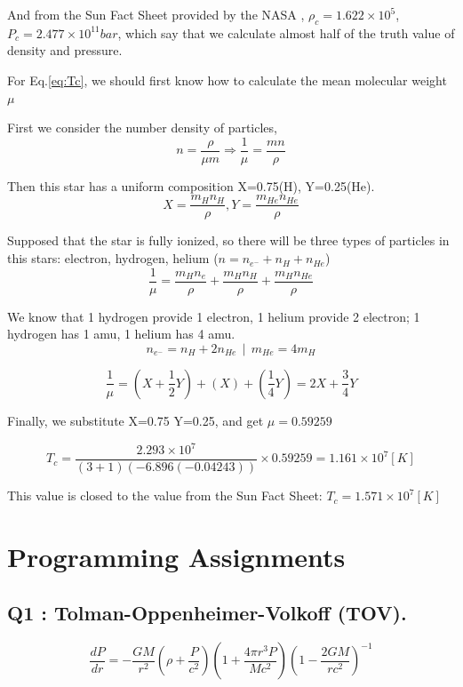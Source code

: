\documentclass{article}
\begin{document}
And from the Sun Fact Sheet provided by the NASA \cite{b1}, $\rho_c=1.622 \times 10^5$, 
$P_c=2.477 \times 10^{11} bar$, which say that we calculate almost half of the truth value of density and pressure.

For Eq.\ref{eq:Tc}, we should first know how to calculate the mean molecular weight $\mu$ \cite{b2}

First we consider the number density of particles,
$$
n=\frac{\rho}{\mu m}
\Rightarrow
\frac{1}{\mu}=\frac{mn}{\rho}
$$

Then this star has a uniform composition X=0.75(H), Y=0.25(He).
$$
X=\frac{m_H n_H}{\rho},
Y=\frac{m_{He} n_{He}}{\rho}
$$

Supposed that the star is fully ionized, so there will be three types of particles in this stars: electron, hydrogen, helium ($n=n_{e^-}+n_H+n_{He}$)
$$
\frac{1}{\mu}=
\frac{m_H n_e}{\rho}+\frac{m_H n_H}{\rho}+\frac{m_{H} n_{He}}{\rho}
$$

We know that 1 hydrogen provide 1 electron, 1 helium provide 2 electron; 1 hydrogen has 1 amu, 1 helium has 4 amu.
$$
n_{e^-}=n_H+2n_{He} \  \ | \ \  m_{He}=4m_{H}
$$

$$
\frac{1}{\mu}
=(X+\frac{1}{2}Y)+(X)+(\frac{1}{4}Y)
=2X+\frac{3}{4}Y
$$

Finally, we substitute X=0.75 Y=0.25, and get $\mu=0.59259$

$$
T_c=
\frac{2.293 \times 10^7}
{(3+1)(-6.896(-0.04243))}
\times 0.59259=1.161 \times 10^7 [K]
$$

This value is closed to the value from the Sun Fact Sheet: 
$T_c=1.571 \times 10^7 [K]$


\section{Programming Assignments}

\subsection*{Q1 : Tolman-Oppenheimer-Volkoff (TOV).}
\begin{equation}
    \frac{dP}{dr}=
    -\frac{GM}{r^2}
    (\rho+\frac{P}{c^2})
    (1+\frac{4\pi r^3 P}{Mc^2})
    (1-\frac{2GM}{rc^2})^{-1}
    \label{eq:tov}
\end{equation}
\end{document}
